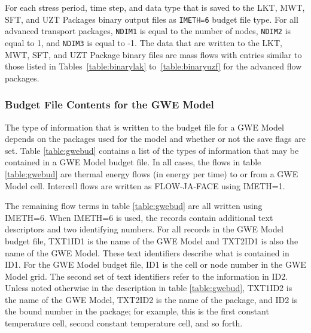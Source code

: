 \vspace{5mm}
For each stress period, time step, and data type that is saved to the LKT, MWT, SFT, and UZT Packages binary output files as \texttt{IMETH=6} budget file type. For all advanced transport packages, \texttt{NDIM1} is equal to the number of nodes, \texttt{NDIM2} is equal to 1, and \texttt{NDIM3} is equal to -1. The data that are written to the LKT, MWT, SFT, and UZT Package binary files are mass flows with entries similar to those listed in Tables~\ref{table:binarylak} to~\ref{table:binaryuzf} for the advanced flow packages.

\newpage
\subsubsection{Budget File Contents for the GWE Model}

The type of information that is written to the budget file for a GWE Model depends on the packages used for the model and whether or not the save flags are set.  Table \ref{table:gwebud} contains a list of the types of information that may be contained in a GWE Model budget file.  In all cases, the flows in table \ref{table:gwebud} are thermal energy flows (in energy per time) to or from a GWE Model cell.  Intercell flows are written as FLOW-JA-FACE using IMETH=1.

The remaining flow terms in table \ref{table:gwebud} are all written using IMETH=6.  When IMETH=6 is used, the records contain additional text descriptors and two identifying numbers.  For all records in the GWE Model budget file, TXT1ID1 is the name of the GWE Model and TXT2ID1 is also the name of the GWE Model.  These text identifiers describe what is contained in ID1.  For the GWE Model budget file, ID1 is the cell or node number in the GWE Model grid.  The second set of text identifiers refer to the information in ID2.  Unless noted otherwise in the description in table \ref{table:gwebud}, TXT1ID2 is the name of the GWE Model, TXT2ID2 is the name of the package, and ID2 is the bound number in the package; for example, this is the first constant temperature cell, second constant temperature cell, and so forth.  

